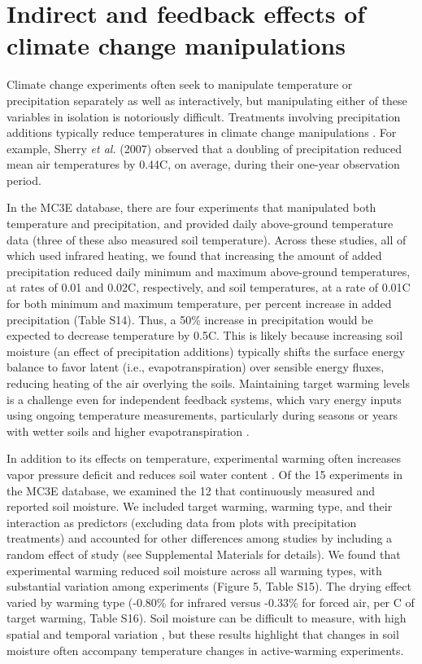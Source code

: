 \documentclass{article}
\begin{document}
\section* {Indirect and feedback effects of climate change manipulations} 
Climate change experiments often seek to manipulate temperature or precipitation separately as well as interactively, but manipulating either of these variables in isolation is notoriously difficult. Treatments involving precipitation additions typically reduce temperatures in climate change manipulations \citep{sherry2007,rollinson2012,mcdaniel2014}. For example, Sherry \emph{et al.} (2007) observed that a doubling of precipitation reduced mean air temperatures by 0.44\degree C, on average, during their one-year observation period. 
\par In the MC3E database, there are four experiments that manipulated both temperature and precipitation, and provided daily above-ground temperature data (three of these also measured soil temperature). Across these studies, all of which used infrared heating, we found that increasing the amount of added precipitation reduced daily minimum and maximum above-ground temperatures, at rates of 0.01 and 0.02\degree C, respectively, and soil temperatures, at a rate of 0.01\degree C for both minimum and maximum temperature, per percent increase in added precipitation (Table S14). Thus, a 50\% increase in precipitation would be expected to decrease temperature by 0.5\degree C.
This is likely because increasing soil moisture (an effect of precipitation additions) typically shifts the surface energy balance to favor latent (i.e., evapotranspiration) over sensible energy fluxes, reducing heating of the air overlying the soils. Maintaining target warming levels is a challenge even for independent feedback systems, which vary energy inputs using ongoing temperature measurements, particularly during seasons or years with wetter soils and higher evapotranspiration \citep{rich2015}.
\par In addition to its effects on temperature, experimental warming often increases vapor pressure deficit and reduces soil water content \citep[e.g.,][]{harte1995b,sherry2007,morin2010,pelini2014,templer2016}. Of the 15 experiments in the MC3E database, we examined the 12 that continuously measured and reported soil moisture. We included target warming, warming type, and their interaction as predictors (excluding data from plots with precipitation treatments) and accounted for other differences among studies by including a random effect of study (see Supplemental Materials for details). We found that experimental warming reduced soil moisture across all warming types, with substantial variation among experiments (Figure 5, Table S15). The drying effect varied by warming type (-0.80\% for infrared versus -0.33\% for forced air, per \degree C of target warming, Table S16). Soil moisture can be difficult to measure, with high spatial and temporal variation \citep{famiglietti1999,teuling2005}, but these results highlight that changes in soil moisture often accompany temperature changes in active-warming experiments.
\end{document}

